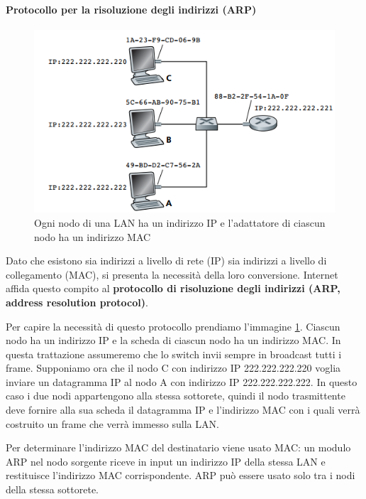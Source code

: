 \documentclass[11pt,a4paper]{book}
\begin{document}
\paragraph{Protocollo per la risoluzione degli indirizzi (ARP)}
\begin{figure}
	\includegraphics[scale=0.6]{img/084.png}
	\caption{Ogni nodo di una LAN ha un indirizzo IP e l'adattatore di ciascun nodo ha un indirizzo MAC}
	\label{fig: 084}
\end{figure}
Dato che esistono sia indirizzi a livello di rete (IP) sia indirizzi a livello di collegamento (MAC), si presenta la necessità della loro conversione. Internet affida questo compito al \textbf{protocollo di risoluzione degli indirizzi (ARP, address resolution protocol)}.

Per capire la necessità di questo protocollo prendiamo l'immagine \ref{fig: 084}. Ciascun nodo ha un indirizzo IP e la scheda di ciascun nodo ha un indirizzo MAC. In questa trattazione assumeremo che lo switch invii sempre in broadcast tutti i frame. Supponiamo ora che il nodo C con indirizzo IP 222.222.222.220 voglia inviare un datagramma IP al nodo A con indirizzo IP 222.222.222.222. In questo caso i due nodi appartengono alla stessa sottorete, quindi il nodo trasmittente deve fornire alla sua scheda il datagramma IP e l'indirizzo MAC con i quali verrà costruito un frame che verrà immesso sulla LAN.

Per determinare l'indirizzo MAC del destinatario viene usato MAC: un modulo ARP nel nodo sorgente riceve in input un indirizzo IP della stessa LAN e restituisce l'indirizzo MAC corrispondente. ARP può essere usato solo tra i nodi della stessa sottorete.
\end{document}
